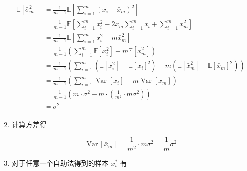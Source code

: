\documentclass[answers]{exam}  %
\begin{document}
\begin{questions}
\begin{solution}
\begin{enumerate}
            \begin{equation}
              \begin{aligned}
                \mathbb{E}[\bar{\sigma}_m^{2}] & = \frac{1}{m - 1} \mathbb{E}[\sum_{i=1}^{m} (x_i - \bar{x}_m)^{2}]                                                                            \\
                                               & = \frac{1}{m - 1} \mathbb{E}[\sum_{i=1}^{m} x_{i}^{2} - 2 \bar{x}_{m} \sum_{i=1}^{m} x_{i} + \sum_{i=1}^{m}\bar{x}_{m}^{2}]                   \\
                                               & = \frac{1}{m - 1} \mathbb{E}[\sum_{i=1}^{m} x_{i}^{2} - m \bar{x}_{m}^{2}]                                                                    \\
                                               & = \frac{1}{m - 1} (\sum_{i=1}^{m}\mathbb{E}[x_{i}^{2}] - m \mathbb{E}[\bar{x}_{m}^{2}])                                                       \\
                                               & = \frac{1}{m - 1} (\sum_{i=1}^{m}(\mathbb{E}[x_{i}^{2}] - \mathbb{E}[x_i]^{2}) - m (\mathbb{E}[\bar{x}_{m}^{2}] - \mathbb{E}[\bar{x}_m]^{2})) \\
                                               & = \frac{1}{m - 1} (\sum_{i=1}^{m}\operatorname{Var}[x_i] - m \operatorname{Var}[\bar{x}_m])                                                   \\
                                               & = \frac{1}{m - 1} (m\cdot \sigma^{2} - m \cdot (\frac{1}{m^{2}} \cdot m \sigma^{2}))                                                          \\
                                               & = \sigma^{2}                                                                                                                                  \\
              \end{aligned}
            \end{equation}

      \item 计算方差得

            \begin{equation}
              \operatorname{Var}[\bar{x}_m] = \frac{1}{m^{2}} \cdot m \sigma^{2} = \frac{1}{m}\sigma^{2}
            \end{equation}

      \item 对于任意一个自助法得到的样本 $x_i^{*}$ 有


\end{enumerate}
\end{solution}
\end{questions}
\end{document}
